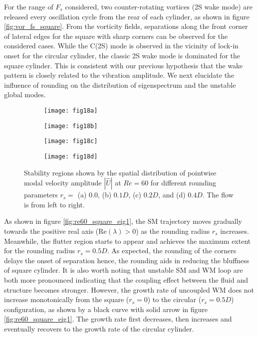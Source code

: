 \documentclass{jfm}
\begin{document}
%
For the range of $F_s$ considered, two counter-rotating vortices (2S wake mode) are released 
every oscillation cycle from the rear of each cylinder, as shown in figure \ref{fig:vor_fs_square}. 
From the vorticity fields, separations along the front corner of lateral edges  
for the square with sharp corners can be observed for the considered cases.
While the C(2S) mode is observed in the vicinity of lock-in onset for the circular cylinder, the 
classic 2S wake mode is dominated for the square cylinder. 
This is consistent with our previous hypothesis that 
the wake pattern is closely related to the vibration amplitude.
%
We next elucidate the influence of rounding 
on the distribution of eigenspectrum and the unstable global 
modes.


\begin{figure}
\centering
\begin{subfigure}{0.495\textwidth}
\centering
	 \texttt{[image: fig18a]}
    \caption{}
    \label{fig:square_r00}
    \end{subfigure} 
\begin{subfigure}{0.495\textwidth} 
\centering
     \texttt{[image: fig18b]}
	\caption{}
	\label{fig:square_r01}
	\end{subfigure}	
\begin{subfigure}{0.495\textwidth} 
\centering
     \texttt{[image: fig18c]}
	\caption{}
	\label{fig:square_r02}
	\end{subfigure}	
\begin{subfigure}{0.495\textwidth} 
\centering
     \texttt{[image: fig18d]}
	\caption{}
	\label{fig:square_r04}
	\end{subfigure}	
     \caption{Stability regions shown by the spatial distribution of pointwise 
     modal velocity amplitude $|\widehat{U}|$ at $Re=60$ 
     for different rounding parameters $r_s=$
     (a) 0.0, (b) $0.1D$, (c) $0.2D$, and (d) $0.4D$. 
     The flow is from left to right.}
\label{fig:square_mode}
\end{figure}
 
As shown in figure \ref{fig:re60_square_eig1}, 
the SM trajectory moves gradually towards the positive real axis (Re$(\lambda)> 0$) 
as the rounding radius  $r_s$ increases. 
Meanwhile, the flutter region starts to appear and achieves the maximum 
extent for the rounding radius $r_{s}=0.5D$. 
%
As expected, the rounding of the 
corners delays the onset of separation hence, the rounding aids in reducing the bluffness of square cylinder. 
%
It is also worth noting that unstable SM and WM loop are both more 
pronounced indicating that the coupling effect between the fluid and structure becomes stronger.
%
However, the growth rate of uncoupled WM does not increase monotonically 
from the square ($r_s=0$) to the circular ($r_s=0.5D$) configuration, 
as shown by a black curve with solid arrow in figure \ref{fig:re60_square_eig1}.  
%
The growth rate first decreases, 
then increases and eventually recovers to the growth rate of the circular cylinder.
\end{document}
